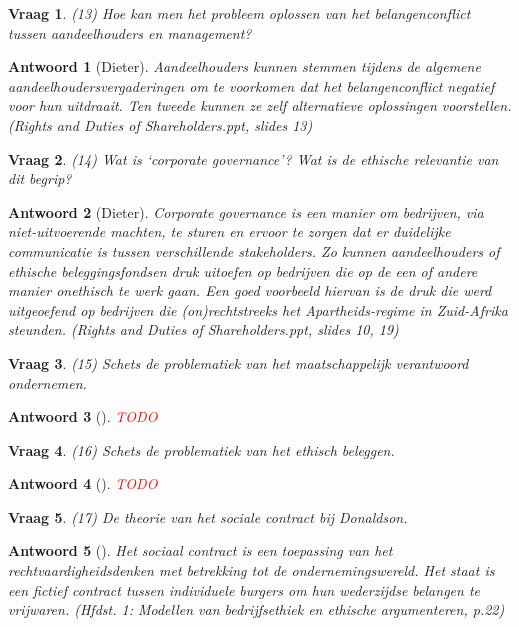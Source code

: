 \documentclass{article}
\theoremstyle{nonumberplain}
\newtheorem{question}{Vraag}
\newtheorem{answer}{Antwoord}
\begin{document}
\begin{question}
(13)	Hoe kan men het probleem oplossen van het belangenconflict tussen aandeelhouders en management?  
\end{question}
\begin{answer}[Dieter]
	Aandeelhouders kunnen stemmen tijdens de algemene aandeelhoudersvergaderingen om te voorkomen dat het belangenconflict negatief voor hun uitdraait. 
	Ten tweede kunnen ze zelf alternatieve oplossingen voorstellen.
	\textit{(Rights and Duties of Shareholders.ppt, slides 13)}
\end{answer}

\begin{question}
(14)	Wat is `corporate governance'? Wat is de ethische relevantie van dit begrip?  
\end{question}
\begin{answer}[Dieter]
	\emph{Corporate governance} is een manier om bedrijven, via niet-uitvoerende machten, te sturen en ervoor te zorgen dat er duidelijke communicatie is tussen verschillende stakeholders.
	Zo kunnen aandeelhouders of ethische beleggingsfondsen druk uitoefen op bedrijven die op de een of andere manier onethisch te werk gaan. Een goed voorbeeld hiervan is de druk die werd uitgeoefend op bedrijven die (on)rechtstreeks het Apartheids-regime in Zuid-Afrika steunden.
	\textit{(Rights and Duties of Shareholders.ppt, slides 10, 19)}
\end{answer}

\begin{question}
(15)	Schets de problematiek van het maatschappelijk verantwoord ondernemen.
\end{question}
\begin{answer}[]
\textcolor{red}{TODO}%
\end{answer}

\begin{question}
(16)	Schets de problematiek van het ethisch beleggen.
\end{question}
\begin{answer}[]
\textcolor{red}{TODO}%
\end{answer}

\begin{question}
(17)	De theorie van het sociale contract bij Donaldson. 
\end{question}
\begin{answer}[]
	Het sociaal contract is een toepassing van het rechtvaardigheidsdenken met betrekking tot de ondernemingswereld.
	Het staat is een fictief contract tussen individuele burgers om hun wederzijdse belangen te vrijwaren.
	\textit{(Hfdst. 1: Modellen van bedrijfsethiek en ethische argumenteren, p.22)}
\end{answer}
\end{document}
